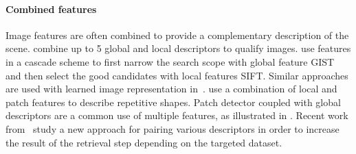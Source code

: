 		\paragraph{Combined features}
			Image features are often combined to provide a complementary description of the scene. \citet{Hays2008} combine up to 5 global and local descriptors to qualify images. \citet{Azzi2016} use features in a cascade scheme to first narrow the search scope with global feature GIST and then select the good candidates with local features SIFT. Similar approaches are used with learned image representation in~\citep{Sarlin2018a,Sarlin2018,Rocco2018,Sattler2017,Piasco2019a,Taira2018,Dusmanu2019}. \citet{Morago2016} use a combination of local and patch features to describe repetitive shapes. Patch detector coupled with global descriptors are a common use of multiple features, as illustrated in \citep{Kim2015,Gordo2016,Sunderhauf2015a,Yan2016}. Recent work from~\citet{Bhowmik2017} study a new approach for pairing various descriptors in order to increase the result of the retrieval step depending on the targeted dataset.
						
		